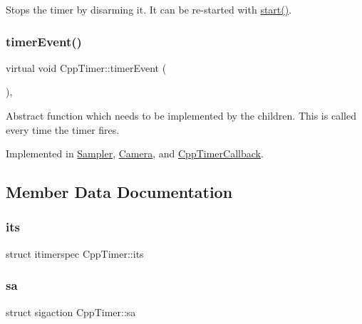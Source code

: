 Stops the timer by disarming it. It can be re-\/started with \hyperlink{classCppTimer_a64989025caa3c030c6c397ca76a2d20b}{start()}. \mbox{\label{classCppTimer_ac2665403595b6aee5f581d0ebfeb886c}} 
\subsubsection{\texorpdfstring{timer\+Event()}{timerEvent()}}
{\footnotesize\ttfamily virtual void Cpp\+Timer\+::timer\+Event (\begin{DoxyParamCaption}{ }\end{DoxyParamCaption})\hspace{0.3cm}{\ttfamily [protected]}, {}}

Abstract function which needs to be implemented by the children. This is called every time the timer fires. 

Implemented in \hyperlink{classSampler_addf333c6e247ee3a1def41260caa902a}{Sampler}, \hyperlink{classCamera_afcf6ca7256cd36f2f4a5ba088d67090a}{Camera}, and \hyperlink{classCppTimerCallback_af6b39f5eb8e98bfc1b301ac3f25276e9}{Cpp\+Timer\+Callback}.



\subsection{Member Data Documentation}
\mbox{\label{classCppTimer_a8774fb5ba9af8f276874c1234741f106}} 
\subsubsection{\texorpdfstring{its}{its}}
{\footnotesize\ttfamily struct itimerspec Cpp\+Timer\+::its\hspace{0.3cm}{\ttfamily [private]}}

\mbox{\label{classCppTimer_a692a200df6d2c43b72ff1db76458f09f}} 
\subsubsection{\texorpdfstring{sa}{sa}}
{\footnotesize\ttfamily struct sigaction Cpp\+Timer\+::sa\hspace{0.3cm}{\ttfamily [private]}}

